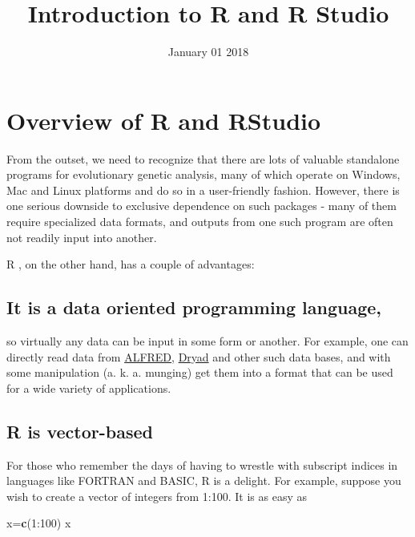 \documentclass[]{tufte-book}
\title{Introduction to R and R Studio}
\date{January 01 2018}
\newenvironment{Shaded}{}{}
\newcommand{\KeywordTok}[1]{\textcolor[rgb]{0.00,0.44,0.13}{\textbf{#1}}}
\newcommand{\DecValTok}[1]{\textcolor[rgb]{0.25,0.63,0.44}{#1}}
\newcommand{\OperatorTok}[1]{\textcolor[rgb]{0.40,0.40,0.40}{#1}}
\newcommand{\NormalTok}[1]{#1}
\begin{document}
\maketitle




\chapter{Overview of R and RStudio}\label{overview-of-r-and-rstudio}

From the outset, we need to recognize that there are lots of valuable
standalone programs for evolutionary genetic analysis, many of which
operate on Windows, Mac and Linux platforms and do so in a user-friendly
fashion. However, there is one serious downside to exclusive dependence
on such packages - many of them require specialized data formats, and
outputs from one such program are often not readily input into another.

R \citep{RHome}, on the other hand, has a couple of advantages:

\section{It is a data oriented programming
language,}\label{it-is-a-data-oriented-programming-language}

so virtually any data can be input in some form or another. For example,
one can directly read data from
\href{http://alfred.med.yale.edu}{ALFRED},
\href{http://www.datadryad.org}{Dryad} and other such data bases, and
with some manipulation (a. k. a. munging) get them into a format that
can be used for a wide variety of applications.

\section{R is vector-based}\label{r-is-vector-based}

For those who remember the days of having to wrestle with subscript
indices in languages like FORTRAN and BASIC, R is a delight. For
example, suppose you wish to create a vector of integers from 1:100. It
is as easy as

\begin{Shaded}
\begin{Highlighting}[]
\NormalTok{x=}\KeywordTok{c}\NormalTok{(}\DecValTok{1}\OperatorTok{:}\DecValTok{100}\NormalTok{)}
\NormalTok{x}
\end{Highlighting}
\end{Shaded}
\end{document}
